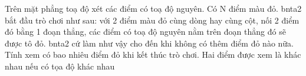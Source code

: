 Trên mặt phẳng toạ độ xét các điểm có toạ độ nguyên. Có N điểm màu đỏ. bnta2 bắt đầu trò chơi như sau: với 2 điểm màu đỏ cùng dòng hay cùng cột, nối 2 điểm đó bằng 1 đoạn thẳng, các điểm có toạ độ nguyên nằm trên đoạn thẳng đó sẽ được tô đỏ. bnta2 cứ làm như vậy cho đến khi không có thêm điểm đỏ nào nữa.   Tính xem có bao nhiêu điểm đỏ khi kết thúc trò chơi. Hai điểm được xem là khác nhau nếu có tọa độ khác nhau